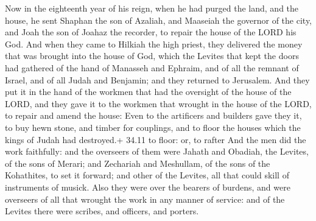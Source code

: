  Now in the eighteenth year of his reign, when he had
purged the land, and the house, he sent Shaphan the son of Azaliah, and
Maaseiah the governor of the city, and Joah the son of Joahaz the
recorder, to repair the house of the LORD his God.  And when
they came to Hilkiah the high priest, they delivered the money that was
brought into the house of God, which the Levites that kept the doors had
gathered of the hand of Manasseh and Ephraim, and of all the remnant of
Israel, and of all Judah and Benjamin; and they returned to Jerusalem.
 And they put it in the hand of the workmen that had the
oversight of the house of the LORD, and they gave it to the workmen that
wrought in the house of the LORD, to repair and amend the house:
 Even to the artificers and builders gave they it, to buy
hewn stone, and timber for couplings, and to floor the houses which the
kings of Judah had destroyed.+ 34.11 to floor: or, to rafter
 And the men did the work faithfully: and the overseers of
them were Jahath and Obadiah, the Levites, of the sons of Merari; and
Zechariah and Meshullam, of the sons of the Kohathites, to set it
forward; and other of the Levites, all that could skill of instruments
of musick.  Also they were over the bearers of burdens, and
were overseers of all that wrought the work in any manner of service:
and of the Levites there were scribes, and officers, and porters.

